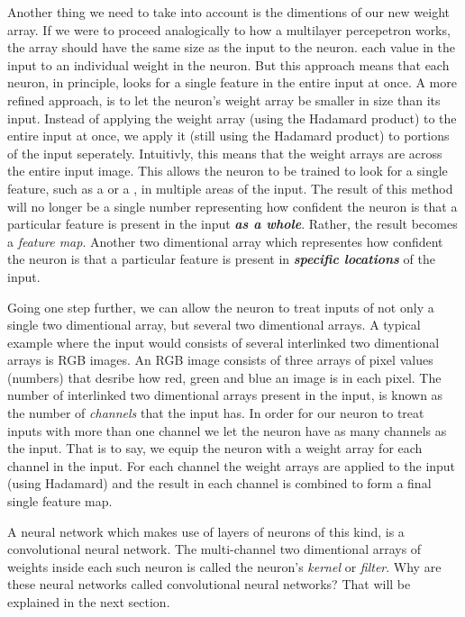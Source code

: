 \indentation
Another thing we need to take into account is the dimentions of our new weight array.
If we were to proceed analogically to how a multilayer percepetron works, the array should have the same size as the input to the neuron.
 each value in the input to an individual weight in the neuron.
But this approach means that each neuron, in principle, looks for a single feature in the entire input at once.
A more refined approach, is to let the neuron's weight array be smaller in size than its input.
Instead of applying the weight array (using the Hadamard product) to the entire input at once, we apply it (still using the Hadamard product) to portions of the input seperately.
Intuitivly, this means that the weight arrays are  across the entire input image.
This allows the neuron to be trained to look for a single feature, such as a  or a , in multiple areas of the input.
The result of this method will no longer be a single number representing how  confident the neuron is that a particular feature is present in the input {\em\bf as a whole}.
Rather, the result becomes a {\em feature map}.
Another two dimentional array which representes how  confident the neuron is that a particular feature is present in {\em\bf specific locations} of the input.

Going one step further, we can allow the neuron to treat inputs of not only a single two dimentional array, but several two dimentional arrays.
A typical example where the input would consists of several interlinked two dimentional arrays is RGB images.
An RGB image consists of three arrays of pixel values (numbers) that desribe how red, green and blue an image is in each pixel.
The number of interlinked two dimentional arrays present in the input, is known as the number of {\em channels} that the input has.
In order for our neuron to treat inputs with more than one channel we let the neuron have as many channels as the input.
That is to say, we equip the neuron with a weight array for each channel in the input.
For each channel the weight arrays are applied to the input (using Hadamard) and the result in each channel is combined to form a final single feature map.

A neural network which makes use of layers of neurons of this kind, is a convolutional neural network.
The multi-channel two dimentional arrays of weights inside each such neuron is called the neuron's {\em kernel} or {\em filter}.
Why are these neural networks called convolutional neural networks?
That will be explained in the next section.

